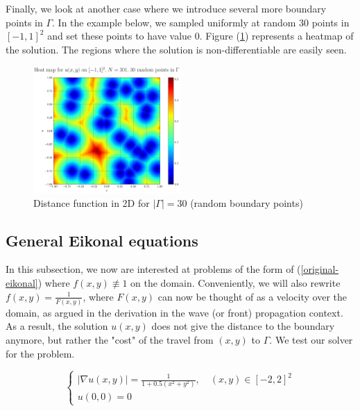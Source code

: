 \documentclass[11pt]{article}
\theoremstyle{definition}
\theoremstyle{remark}
\begin{document}
\FloatBarrier

\noindent Finally, we look at another case where we introduce several more boundary points in $\Gamma$. In the example below, we sampled uniformly at random 30 points in $[-1,1]^2$ and set these points to have value 0. Figure (\ref{fig:heatmap30random}) represents a heatmap of the solution. The regions where the solution is non-differentiable are easily seen.

\begin{figure}[h!]
  \centering
  \includegraphics[width=0.5\textwidth]{plots/heatmap_random30.png}
  \caption{Distance function in 2D for $|\Gamma|=30$ (random boundary points)}
  \label{fig:heatmap30random}
\end{figure}

\newpage

\subsection{General Eikonal equations}
In this subsection, we now are interested at problems of the form of (\ref{original-eikonal}) where $f(x,y)\not\equiv 1$ on the domain. Conveniently, we will also rewrite $f(x,y)=\frac{1}{F(x,y)}$, where $F(x,y)$ can now be thought of as a velocity over the domain, as argued in the derivation in the wave (or front) propagation context. As a result, the solution $u(x,y)$ does not give the distance to the boundary anymore, but rather the "cost" of the travel from $(x,y)$ to $\Gamma$.
We test our solver for the problem.

\begin{equation}
\label{arctan_equation}
    \begin{cases}
        |\nabla u(x,y)|=\frac{1}{1+0.5(x^2+y^2)} , \quad(x,y) \in [-2,2]^2 \\
        u(0,0)= 0
    \end{cases}
\end{equation} \\
\end{document}
